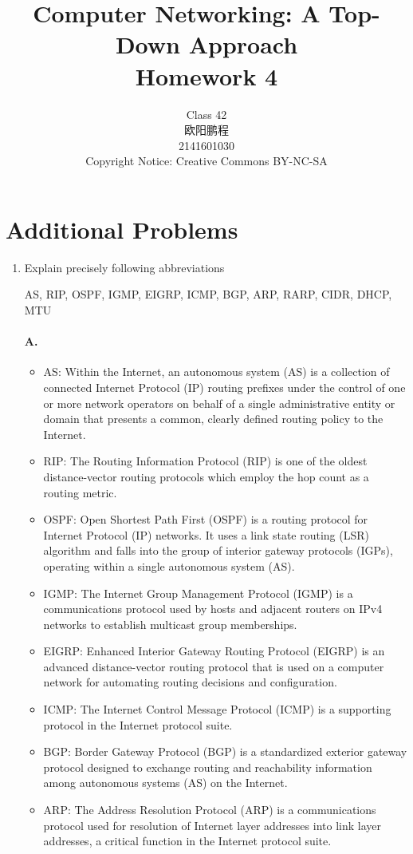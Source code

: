\documentclass[]{article}
\title{Computer Networking: A Top-Down Approach \\ Homework 4}
\author{Class 42 \\ 欧阳鹏程 \\ 2141601030 \\ Copyright Notice: Creative Commons BY-NC-SA}
\begin{document}
\maketitle

\section{Additional Problems}
\begin{enumerate}
	\item Explain precisely following abbreviations
	
	AS, RIP, OSPF, IGMP, EIGRP, ICMP, BGP, ARP, RARP, CIDR, DHCP, MTU
	\paragraph{A.}
	\begin{itemize}
		\item AS: Within the Internet, an autonomous system (AS) is a collection of connected Internet Protocol (IP) routing prefixes under the control of one or more network operators on behalf of a single administrative entity or domain that presents a common, clearly defined routing policy to the Internet.
		\item RIP: The Routing Information Protocol (RIP) is one of the oldest distance-vector routing protocols which employ the hop count as a routing metric. 
		\item OSPF: Open Shortest Path First (OSPF) is a routing protocol for Internet Protocol (IP) networks. It uses a link state routing (LSR) algorithm and falls into the group of interior gateway protocols (IGPs), operating within a single autonomous system (AS). 
		\item IGMP: The Internet Group Management Protocol (IGMP) is a communications protocol used by hosts and adjacent routers on IPv4 networks to establish multicast group memberships.
		\item EIGRP: Enhanced Interior Gateway Routing Protocol (EIGRP) is an advanced distance-vector routing protocol that is used on a computer network for automating routing decisions and configuration.
		\item ICMP: The Internet Control Message Protocol (ICMP) is a supporting protocol in the Internet protocol suite.
		\item BGP: Border Gateway Protocol (BGP) is a standardized exterior gateway protocol designed to exchange routing and reachability information among autonomous systems (AS) on the Internet.
		\item ARP: The Address Resolution Protocol (ARP) is a communications protocol used for resolution of Internet layer addresses into link layer addresses, a critical function in the Internet protocol suite.

\end{itemize}
\end{enumerate}
\end{document}
